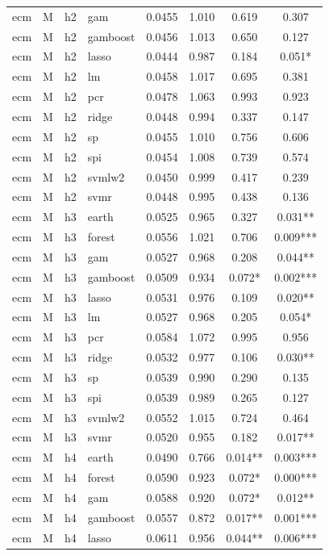 \begin{ThreePartTable}
\begin{longtable}[t]{llclcccc}
ecm & M & h2 & gam & 0.0455 & 1.010 & 0.619 & 0.307\\
ecm & M & h2 & gamboost & 0.0456 & 1.013 & 0.650 & 0.127\\
ecm & M & h2 & lasso & 0.0444 & 0.987 & 0.184 & 0.051*\\
ecm & M & h2 & lm & 0.0458 & 1.017 & 0.695 & 0.381\\
ecm & M & h2 & pcr & 0.0478 & 1.063 & 0.993 & 0.923\\
ecm & M & h2 & ridge & 0.0448 & 0.994 & 0.337 & 0.147\\
ecm & M & h2 & sp & 0.0455 & 1.010 & 0.756 & 0.606\\
ecm & M & h2 & spi & 0.0454 & 1.008 & 0.739 & 0.574\\
ecm & M & h2 & svmlw2 & 0.0450 & 0.999 & 0.417 & 0.239\\
ecm & M & h2 & svmr & 0.0448 & 0.995 & 0.438 & 0.136\\
\addlinespace
ecm & M & h3 & earth & 0.0525 & 0.965 & 0.327 & 0.031**\\
ecm & M & h3 & forest & 0.0556 & 1.021 & 0.706 & 0.009***\\
ecm & M & h3 & gam & 0.0527 & 0.968 & 0.208 & 0.044**\\
ecm & M & h3 & gamboost & 0.0509 & 0.934 & 0.072* & 0.002***\\
ecm & M & h3 & lasso & 0.0531 & 0.976 & 0.109 & 0.020**\\
ecm & M & h3 & lm & 0.0527 & 0.968 & 0.205 & 0.054*\\
ecm & M & h3 & pcr & 0.0584 & 1.072 & 0.995 & 0.956\\
ecm & M & h3 & ridge & 0.0532 & 0.977 & 0.106 & 0.030**\\
ecm & M & h3 & sp & 0.0539 & 0.990 & 0.290 & 0.135\\
ecm & M & h3 & spi & 0.0539 & 0.989 & 0.265 & 0.127\\
ecm & M & h3 & svmlw2 & 0.0552 & 1.015 & 0.724 & 0.464\\
ecm & M & h3 & svmr & 0.0520 & 0.955 & 0.182 & 0.017**\\
\addlinespace
ecm & M & h4 & earth & 0.0490 & 0.766 & 0.014** & 0.003***\\
ecm & M & h4 & forest & 0.0590 & 0.923 & 0.072* & 0.000***\\
ecm & M & h4 & gam & 0.0588 & 0.920 & 0.072* & 0.012**\\
ecm & M & h4 & gamboost & 0.0557 & 0.872 & 0.017** & 0.001***\\
ecm & M & h4 & lasso & 0.0611 & 0.956 & 0.044** & 0.006***\\

\end{longtable}
\end{ThreePartTable}
